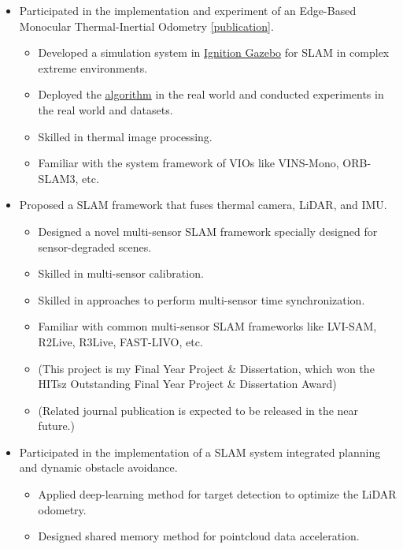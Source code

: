 \documentclass[11pt,a4paper]{moderncv}        %
\begin{document}
%
{
\begin{itemize}%
\item Participated in the implementation and experiment of an Edge-Based Monocular Thermal-Inertial Odometry \hyperref[sec:Publications]{[publication]}.
\begin{itemize}%
\hypersetup{urlcolor=black}
\item Developed a simulation system in \href{https://gazebosim.org/api/gazebo/2.10/index.html}{Ignition Gazebo} for SLAM in complex extreme environments.
\item Deployed the \hyperref[sec:Publications]{algorithm} in the real world and conducted experiments in the real world and datasets.
\item Skilled in thermal image processing.
\item Familiar with the system framework of VIOs like VINS-Mono, ORB-SLAM3, etc.
\end{itemize}
\item Proposed a SLAM framework that fuses thermal camera, LiDAR, and IMU.
\begin{itemize}%
\item Designed a novel multi-sensor SLAM framework specially designed for sensor-degraded scenes. 
\item Skilled in multi-sensor calibration.
\item Skilled in approaches to perform multi-sensor time synchronization.
\item Familiar with common multi-sensor SLAM frameworks like LVI-SAM, R2Live, R3Live, FAST-LIVO, etc.
\item (This project is my Final Year Project \& Dissertation, which won the HITsz Outstanding Final Year Project \& Dissertation Award)
\item (Related journal publication is expected to be released in the near future.)
\end{itemize}
\item Participated in the implementation of a SLAM system integrated planning and dynamic obstacle avoidance.
\begin{itemize}%
\item Applied deep-learning method for target detection to optimize the LiDAR odometry.
\item Designed shared memory method for pointcloud data acceleration.
\end{itemize}
\end{itemize}
}
\end{document}
